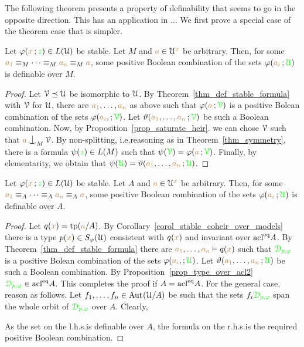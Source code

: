 \documentclass[creche.tex]{subfiles}
\begin{document}
The following theorem presents a property of definability that seems to go in the opposite direction.
This has an application in ...
We first prove a special case of the theorem case that is simpler.

\begin{proposition}
  Let $\varphi({\color{brown} x}\,;{\color{green} z})\in L(\EuScript U)$ be stable.
  Let $M$ and ${\color{brown} a}\in\EuScript U^{\color{brown} x}$ be arbitrary.
  Then, for some ${\color{brown} a_1}\equiv_M\dots\equiv_M{\color{brown} a_n}\equiv_M{\color{brown} a}$, some positive Boolean combination of the sets $\varphi({\color{brown} a_i}\,;{\color{green}\EuScript U})$ is definable over $M$.
\end{proposition}

\begin{proof}
  Let $\EuScript V\preceq\EuScript U$ be isomorphic to $\EuScript U$.
  By Theorem~\ref{thm_def_stable_formula} with $\EuScript V$ for $\EuScript U$, there are ${\color{brown} a_1},\dots,{\color{brown} a_n}$ as above such that $\varphi({\color{brown} a}\,;{\color{green}\EuScript V})$ is a positive Bolean combination of the sets $\varphi({\color{brown} a_i},;{\color{green}\EuScript V})$.
  Let $\vartheta({\color{brown} a_1},\dots,{\color{brown} a_n}\,;{\color{green}\EuScript V})$ be such a Boolean combination.
  Now, by Proposition~\ref{prop_saturate_heir}. we can chose $\EuScript V$ such that ${\mr a}\nonfork_M\V$.
  By non-splitting, i.e.\@ reasoning as in Theorem~\ref{thm_symmetry}, there is a formula $\psi({\color{green} z})\in L(M)$ such that $\psi({\color{green}\EuScript V})=\varphi({\color{brown} a}\,;{\color{green}\EuScript V})$.
  Finally, by elementarity, we obtain that $\psi({\color{green}\EuScript U})=\vartheta({\color{brown} a_1},\dots,{\color{brown} a_n}\,;{\color{green}\EuScript U})$.
\end{proof}

\begin{theorem}
  Let $\varphi({\color{brown} x}\,;{\color{green} z})\in L(\EuScript U)$ be stable.
  Let $A$ and ${\color{brown} a}\in\EuScript U^{\color{brown} x}$ be arbitrary.
  Then, for some ${\color{brown} a_1}\equiv_A\dots\equiv_A{\color{brown} a_n}\equiv_A{\color{brown} a}$, some positive Boolean combination of the sets $\varphi({\color{brown} a_i}\,;{\color{green}\EuScript U})$ is definable over $A$.
\end{theorem}

\begin{proof}
    Let $q({\color{brown} x})={\rm tp}({\color{brown} a}/A)$.
    By Corollary~\ref{corol_stable_coheir_over_models} there is a type $p({\color{brown} x})\in S_\varphi(\EuScript U)$ consistent with $q({\color{brown} x})$ and invariant over $\mathop{\rm acl}^{{\rm eq}}\!A$.
    By Theorem~\ref{thm_def_stable_formula} there are ${\color{brown} a_1},\dots,{\color{brown} a_n}\vDash q({\color{brown} x})$ such that ${\color{green}\EuScript D_{p,\varphi}}$ is a positive Bolean combination of the sets $\varphi({\color{brown} a_i},;{\color{green}\EuScript U})$.
    Let $\vartheta({\color{brown} a_1},\dots,{\color{brown} a_n}\,;{\color{green}\EuScript U})$ be such a Boolean combination.
    By Proposition~\ref{prop_type_over_acl2} ${\color{green}\EuScript D_{p,\varphi}}\in\mathop{\rm acl}^{{\rm eq}}\!A$.
    This completes the proof if $A=\mathop{\rm acl}^{{\rm eq}}\!A$.
    For the general case, reason as follows.
    Let $f_1,\dots,f_n\in{\rm Aut\kern.15ex}(\EuScript U/A)$ be such that the sets $f_i{\color{green}\EuScript D_{p,\varphi}}$ span the whole orbit of ${\color{green}\EuScript D_{p,\varphi}}$ over $A$.
    Clearly,


   As the set on the l.h.s.\@ is definable over $A$, the formula on the r.h.s.\@ is the required positive Boolean combination.
\end{proof}
\end{document}
